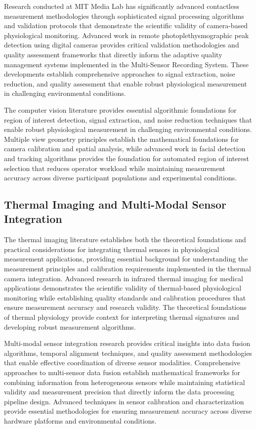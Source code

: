 \documentclass[11pt,a4paper]{report}
\begin{document}
Research conducted at MIT Media Lab has significantly advanced contactless measurement methodologies through sophisticated signal processing algorithms and validation protocols that demonstrate the scientific validity of camera-based physiological monitoring. Advanced work in remote photoplethysmographic peak detection using digital cameras provides critical validation methodologies and quality assessment frameworks that directly inform the adaptive quality management systems implemented in the Multi-Sensor Recording System. These developments establish comprehensive approaches to signal extraction, noise reduction, and quality assessment that enable robust physiological measurement in challenging environmental conditions.

The computer vision literature provides essential algorithmic foundations for region of interest detection, signal extraction, and noise reduction techniques that enable robust physiological measurement in challenging environmental conditions. Multiple view geometry principles establish the mathematical foundations for camera calibration and spatial analysis, while advanced work in facial detection and tracking algorithms provides the foundation for automated region of interest selection that reduces operator workload while maintaining measurement accuracy across diverse participant populations and experimental conditions.

\subsection{Thermal Imaging and Multi-Modal Sensor Integration}

The thermal imaging literature establishes both the theoretical foundations and practical considerations for integrating thermal sensors in physiological measurement applications, providing essential background for understanding the measurement principles and calibration requirements implemented in the thermal camera integration. Advanced research in infrared thermal imaging for medical applications demonstrates the scientific validity of thermal-based physiological monitoring while establishing quality standards and calibration procedures that ensure measurement accuracy and research validity. The theoretical foundations of thermal physiology provide context for interpreting thermal signatures and developing robust measurement algorithms.

Multi-modal sensor integration research provides critical insights into data fusion algorithms, temporal alignment techniques, and quality assessment methodologies that enable effective coordination of diverse sensor modalities. Comprehensive approaches to multi-sensor data fusion establish mathematical frameworks for combining information from heterogeneous sensors while maintaining statistical validity and measurement precision that directly inform the data processing pipeline design. Advanced techniques in sensor calibration and characterization provide essential methodologies for ensuring measurement accuracy across diverse hardware platforms and environmental conditions.
\end{document}
